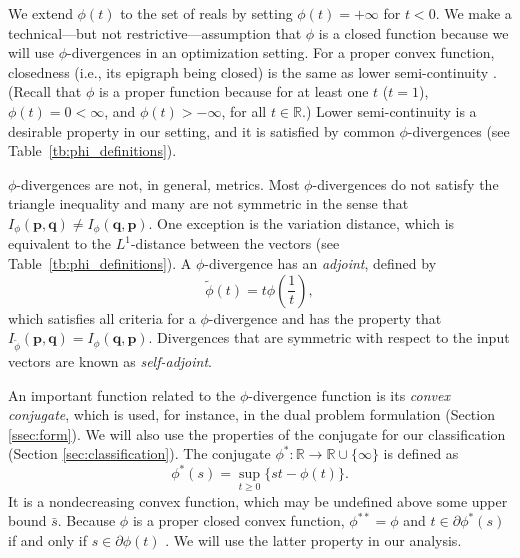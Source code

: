 \documentclass[opre,nonblindrev]{informs3} %
\newcommand{\R}{{\mathbb{R}}}
\newcommand{\q}{\mathbf{q}}
\newcommand{\p}{\mathbf{p}}
\begin{document}
We extend $\phi(t)$ to the set of reals by setting $\phi(t)=+\infty$ for $t<0$.
We make a technical---but not restrictive---assumption 
that $\phi$ is a closed function because we will use $\phi$-divergences in an optimization setting. 
For a proper convex function, closedness (i.e., its epigraph being closed) is the same as lower semi-continuity \citep{rockafellar_70}. 
(Recall that $\phi$ is a proper function because for at least one $t$ ($t=1$), $\phi(t)=0<\infty$, and $\phi(t)>-\infty$, for all $t\in\mathbb{R}$.)
Lower semi-continuity is a desirable property in our setting, and it is satisfied by common $\phi$-divergences (see Table~\ref{tb:phi_definitions}).
  

$\phi$-divergences are not, in general, metrics.
Most $\phi$-divergences do not satisfy the triangle inequality and many are not symmetric in the sense that $I_\phi(\p,\q) \neq I_\phi(\q,\p)$.
One exception is the variation distance, which is equivalent to the $L^1$-distance between the vectors (see Table~\ref{tb:phi_definitions}).
A $\phi$-divergence has an {\it adjoint}, defined by
\begin{equation} \label{eq:adjoint}
	\tilde{\phi}(t) = t \phi\left(\frac{1}{t}\right),
\end{equation}
which satisfies all criteria for a $\phi$-divergence \citep{bental1991certainty} and has the property that $I_{\tilde{\phi}}(\p,\q) = I_\phi(\q,\p)$.
Divergences that are symmetric with respect to the input vectors are known as {\it self-adjoint}.

An important function related to the $\phi$-divergence function is its  {\it  convex conjugate}, which is used, for instance, in the dual problem formulation (Section \ref{ssec:form}). 
We will also use the properties of the conjugate for our classification (Section \ref{sec:classification}). 
The conjugate $\phi^* : \R \rightarrow \R \cup \{\infty\}$ is defined as
\begin{equation} \label{eq:conjugate}
	\phi^*(s) = \sup_{t \geq 0} \{st - \phi(t)\}.
\end{equation}
It is a nondecreasing convex function, which may be undefined above some upper bound $\bar{s}$.
Because $\phi$ is a proper closed convex function, $\phi^{**}=\phi$ and $t \in \partial \phi^*(s)$ if and only if $s \in \partial \phi(t)$ \citep[Corollary 23.5.1]{rockafellar_70}. 
We will use the latter property in our analysis. 
 
\end{document}
